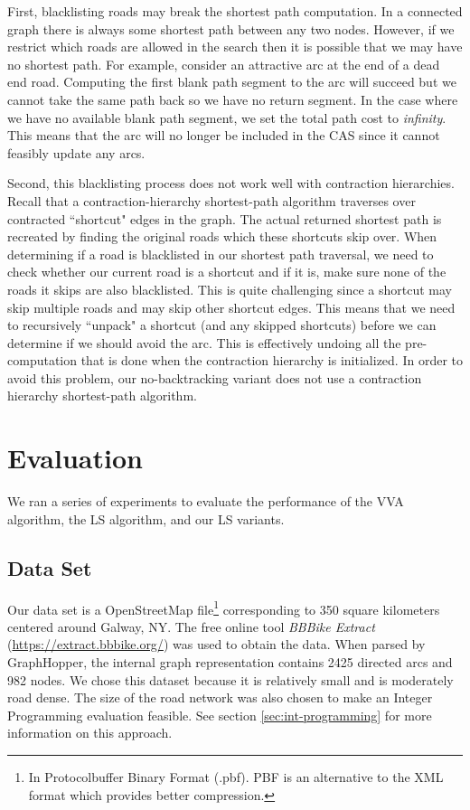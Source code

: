 \documentclass[honors]{union-cs-thesis}
\begin{document}
First, blacklisting roads may break the shortest path computation. In a connected graph there is always some shortest path between any two nodes. However, if we restrict which roads are allowed in the search then it is possible that we may have no shortest path. For example, consider an attractive arc at the end of a dead end road. Computing the first blank path segment to the arc will succeed but we cannot take the same path back so we have no return segment. In the case where we have no available blank path segment, we set the total path cost to \emph{infinity}. This means that the arc will no longer be included in the CAS since it cannot feasibly update any arcs. 

Second, this blacklisting process does not work well with contraction hierarchies. Recall that a contraction-hierarchy shortest-path algorithm traverses over contracted ``shortcut" edges in the graph. The actual returned shortest path is recreated by finding the original roads which these shortcuts skip over. When determining if a road is blacklisted in our shortest path traversal, we need to check whether our current road is a shortcut and if it is, make sure none of the roads it skips are also blacklisted. This is quite challenging since a shortcut may skip multiple roads and may skip other shortcut edges. This means that we need to recursively ``unpack" a shortcut (and any skipped shortcuts)  before we can determine if we should avoid the arc. This is effectively undoing all the pre-computation that is done when the contraction hierarchy is initialized. In order to avoid this problem, our no-backtracking variant does not use a contraction hierarchy shortest-path algorithm.


\section{Evaluation}
We ran a series of experiments to evaluate the performance of the VVA algorithm, the LS algorithm, and our LS variants. 

\subsection{Data Set}
Our data set is a OpenStreetMap file\footnote{In Protocolbuffer Binary Format (.pbf). PBF is an alternative to the XML format which provides better compression.} corresponding to 350 square kilometers centered around Galway, NY. The free online tool \emph{BBBike Extract} (\url{https://extract.bbbike.org/}) was used to obtain the data. When parsed by GraphHopper, the internal graph representation contains 2425 directed arcs and 982 nodes. We chose this dataset because it is relatively small and is moderately road dense. The size of the road network was also chosen to make an Integer Programming evaluation feasible. See section \ref{sec:int-programming} for more information on this approach.
\end{document}
